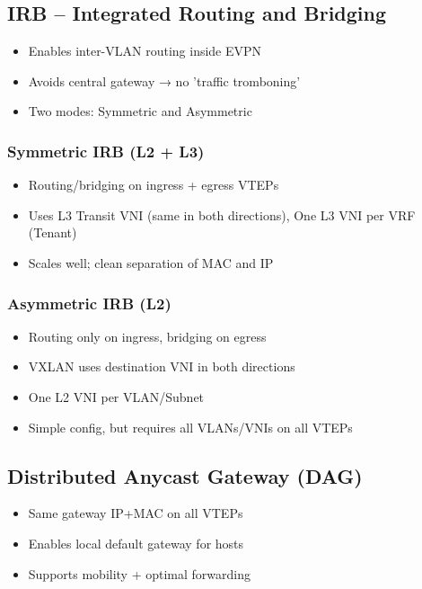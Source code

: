 \begin{multicols*}{5}
		\subsection{IRB – Integrated Routing and Bridging}
		\begin{itemize}
			\item Enables inter-VLAN routing inside EVPN
			\item Avoids central gateway → no 'traffic tromboning'
			\item Two modes: Symmetric and Asymmetric
		\end{itemize}
		
		\subsubsection{Symmetric IRB (L2 + L3)}
		\begin{itemize}
			\item Routing/bridging on ingress + egress VTEPs
			\item Uses L3 Transit VNI (same in both directions), One L3 VNI per VRF (Tenant)
			\item Scales well; clean separation of MAC and IP
		\end{itemize}
		
		\subsubsection{Asymmetric IRB (L2)}
		\begin{itemize}
			\item Routing only on ingress, bridging on egress
			\item VXLAN uses destination VNI in both directions
			\item One L2 VNI per VLAN/Subnet
			\item Simple config, but requires all VLANs/VNIs on all VTEPs
		\end{itemize}
		
		\subsection{Distributed Anycast Gateway (DAG)}
		\begin{itemize}
			\item Same gateway IP+MAC on all VTEPs
			\item Enables local default gateway for hosts
			\item Supports mobility + optimal forwarding
		\end{itemize}
		

\end{multicols*}
